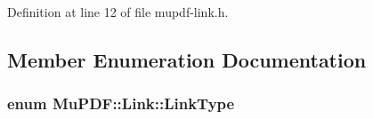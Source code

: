 Definition at line 12 of file mupdf-\/link.\-h.



\subsection{Member Enumeration Documentation}
\hypertarget{class_mu_p_d_f_1_1_link_afdc6828b6e00f323b53d6ae36d0d06b6}{
\subsubsection[{Link\-Type}]{\setlength{\rightskip}{0pt plus 5cm}enum {\bf Mu\-P\-D\-F\-::\-Link\-::\-Link\-Type}}}\label{class_mu_p_d_f_1_1_link_afdc6828b6e00f323b53d6ae36d0d06b6}
